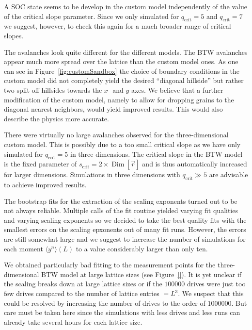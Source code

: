 A SOC state seems to be develop in the custom model independently of the value of the critical slope parameter.
Since we only simulated for $q_{\mathrm{crit}}=5$ and $q_{\mathrm{crit}}=7$ we suggest, however, to check this
again for a much broader range of critical slopes.

The avalanches look quite different for the different models. The BTW avalanches appear much more spread over the
lattice than the custom model ones. As one can see in Figure~\ref{fig:customSandbox} the choice of boundary conditions
in the custom model did not completely yield the desired \enquote{diagonal hillside} but rather two split off hillsides
towards the $x$- and $y$-axes. We believe that a further modification of the custom model, namely to allow for dropping
grains to the diagonal nearest neighbors, would yield improved results.
This would also describe the physics more accurate.

There were virtually no large avalanches observed for the three-dimensional custom model. This is possibly due to a
too small critical slope as we have only simulated for $q_{\mathrm{crit}}=5$ in three dimensions.
The critical slope in the BTW model is the fixed parameter of $s_{\mathrm{crit}}=2\times\operatorname{Dim}
\left[\vec{r}\right]$ and is thus automatically increased for larger dimensions.
Simulations in three dimensions with $q_{\mathrm{crit}}\gg 5$ are advisable to achieve improved results.

The bootstrap fits for the extraction of the scaling exponents turned out to be not always reliable. Multiple calls
of the fit routine yielded varying fit qualities and varying scaling exponents so we decided to take the best quality
fits with the smallest errors on the scaling epxonents out of many fit runs. However, the errors are still somewhat large
and we suggest to increase the number of simulations for each moment $\langle y^n\rangle(L)$ to a value considerably
larger than only ten.

We obtained particularly bad fitting to the measurement points for the three-dimensional BTW model at large lattice
sizes (see Figure~\ref{}). It is yet unclear if the scaling breaks down at large lattice sizes or if the $100000$ drives
were just too few drives compared to the number of lattice entries $=L^3$. We suspect that this could be resolved by
increasing the number of drives to the order of $1000000$. But care must be taken here since the simulations with less
drives and less runs can already take several hours for each lattice size.

